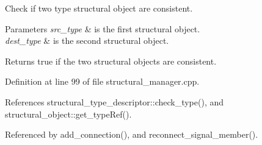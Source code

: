 Check if two type structural object are consistent. 


\begin{DoxyParams}{Parameters}
{\em src\+\_\+type} & is the first structural object. \\
\hline
{\em dest\+\_\+type} & is the second structural object. \\
\hline
\end{DoxyParams}
\begin{DoxyReturn}{Returns}
true if the two structural objects are consistent. 
\end{DoxyReturn}


Definition at line 99 of file structural\+\_\+manager.\+cpp.



References structural\+\_\+type\+\_\+descriptor\+::check\+\_\+type(), and structural\+\_\+object\+::get\+\_\+type\+Ref().



Referenced by add\+\_\+connection(), and reconnect\+\_\+signal\+\_\+member().

